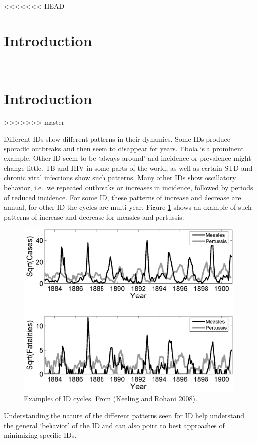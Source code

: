 \documentclass[]{book}
\theoremstyle{definition}
\theoremstyle{definition}
\theoremstyle{definition}
\theoremstyle{remark}
\begin{document}
<<<<<<< HEAD
\hypertarget{introduction-1}{%
\section{Introduction}\label{introduction-1}}
=======
\section{Introduction}\label{introduction-2}
>>>>>>> master

Different IDs show different patterns in their dynamics. Some IDs
produce sporadic outbreaks and then seem to disappear for years. Ebola
is a prominent example. Other ID seem to be `always around' and
incidence or prevalence might change little. TB and HIV in some parts of
the world, as well as certain STD and chronic viral infections show such
patterns. Many other IDs show oscillatory behavior, i.e.~we repeated
outbreaks or increases in incidence, followed by periods of reduced
incidence. For some ID, these patterns of increase and decrease are
annual, for other ID the cycles are multi-year. Figure
\ref{fig:IDcycles} shows an example of such patterns of increase and
decrease for measles and pertussis.

\begin{figure}
\centering
\includegraphics{./images/IDcycles.png}
\caption{\label{fig:IDcycles}Examples of ID cycles. From (Keeling and Rohani
\protect\hyperlink{ref-keeling08}{2008}).}
\end{figure}

Understanding the nature of the different patterns seen for ID help
understand the general `behavior' of the ID and can also point to best
approaches of minimizing specific IDs.
\end{document}
